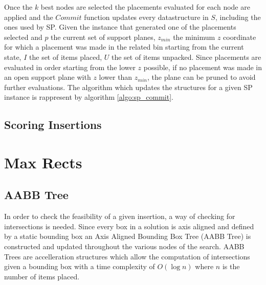 

Once the $k$ best nodes are selected the placements evaluated for each node are applied and the $Commit$ function updates every datastructure in $S$, including the ones used by SP.
Given the instance that generated one of the placements selected and $p$ the current set of support planes, $z_{min}$ the minimum $z$ coordinate for which a placement was made in the related bin starting from the current state, $I$ the set of items placed, $U$ the set of items unpacked.
Since placements are evaluated in order starting from the lower $z$ possible, if no placement was made in an open support plane with $z$ lower than $z_{min}$, the plane can be pruned to avoid further evaluations.
The algorithm which updates the structures for a given SP instance is rappresent by algorithm \ref{algo:sp_commit}.



\subsection{Scoring Insertions}

\section{Max Rects}\label{chapter:heuristics:maxrects}

\subsection{AABB Tree}\label{sec:aabbtree}

In order to check the feasibility of a given insertion,
a way of checking for intersections is needed.
Since every box in a solution is axis aligned and defined by a static bounding box an Axis Aligned Bounding Box Tree (AABB Tree) is constructed and updated throughout the various nodes of the search.
AABB Trees are accelleration structures which allow the computation of intersections given a bounding box with a time complexity of $O(\log{n})$ where $n$ is the number of items placed.
